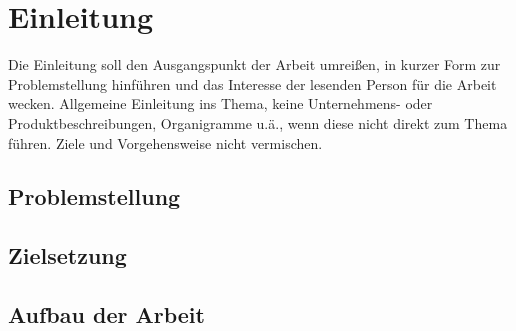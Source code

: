 
\chapter{Einleitung}
Die Einleitung soll den Ausgangspunkt der Arbeit umreißen, in kurzer Form zur Problemstellung hinführen und das Interesse der lesenden Person für die Arbeit wecken. Allgemeine Einleitung ins Thema, keine Unternehmens- oder Produktbeschreibungen, Organigramme u.ä., wenn diese nicht direkt zum Thema führen. Ziele und Vorgehensweise nicht vermischen.

\section{Problemstellung}

\section{Zielsetzung}

\section{Aufbau der Arbeit}
